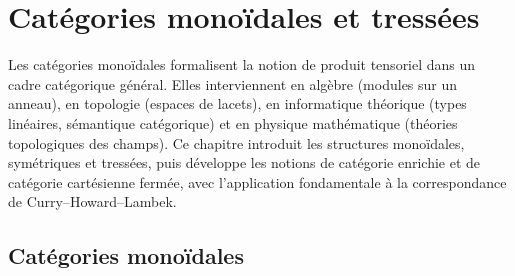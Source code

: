 

\chapter{Catégories monoïdales et tressées}\label{ch:monoidales}
\minitoc

\vspace{1em}

Les catégories monoïdales formalisent la notion de \og produit tensoriel\fg{}
dans un cadre catégorique général.  Elles interviennent en algèbre
(modules sur un anneau), en topologie (espaces de lacets),
en informatique théorique (types linéaires, sémantique catégorique)
et en physique mathématique (théories topologiques des champs).
Ce chapitre introduit les structures monoïdales, symétriques et tressées,
puis développe les notions de catégorie enrichie et de catégorie
cartésienne fermée, avec l'application fondamentale à la correspondance
de Curry--Howard--Lambek.


\section{Catégories monoïdales}\label{sec:cat-monoidale}

